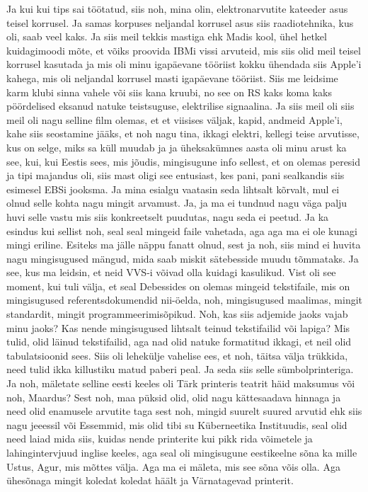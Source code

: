 Ja kui kui tips sai töötatud, siis noh, mina olin, elektronarvutite kateeder asus teisel korrusel. Ja samas korpuses neljandal korrusel asus siis raadiotehnika, kus oli, saab veel kaks. Ja siis meil tekkis mastiga ehk Madis kool, ühel hetkel kuidagimoodi mõte, et võiks proovida IBMi vissi arvuteid, mis siis olid meil teisel korrusel kasutada ja mis oli minu igapäevane tööriist kokku ühendada siis Apple'i kahega, mis oli neljandal korrusel masti igapäevane tööriist. Siis me leidsime karm klubi sinna vahele või siis kana kruubi, no see on RS kaks koma kaks pöördelised eksanud natuke teistsuguse, elektrilise signaalina. Ja siis meil oli siis meil oli nagu selline film olemas, et et viisises väljak, kapid, andmeid Apple'i, kahe siis seostamine jääks, et noh nagu tina, ikkagi elektri, kellegi teise arvutisse, kus on selge, miks sa küll muudab ja ja üheksakümnes aasta oli minu arust ka see, kui, kui Eestis sees, mis jõudis, mingisugune info sellest, et on olemas peresid ja tipi majandus oli, siis mast oligi see entusiast, kes pani, pani sealkandis siis esimesel EBSi jooksma. Ja mina esialgu vaatasin seda lihtsalt kõrvalt, mul ei olnud selle kohta nagu mingit arvamust. Ja, ja ma ei tundnud nagu väga palju huvi selle vastu mis siis konkreetselt puudutas, nagu seda ei peetud. Ja ka esindus kui sellist noh, seal seal mingeid faile vahetada, aga aga ma ei ole kunagi mingi eriline. Esiteks ma jälle näppu fanatt olnud, sest ja noh, siis mind ei huvita nagu mingisugused mängud, mida saab miskit sätebesside muudu tõmmataks. Ja see, kus ma leidsin, et neid VVS-i võivad olla kuidagi kasulikud. Vist oli see moment, kui tuli välja, et seal Debessides on olemas mingeid tekstifaile, mis on mingisugused referentsdokumendid nii-öelda, noh, mingisugused maalimas, mingit standardit, mingit programmeerimisõpikud. Noh, kas siis adjemide jaoks vajab minu jaoks?
Kas nende mingisugused lihtsalt teinud tekstifailid või lapiga?
Mis tulid, olid läinud tekstifailid, aga nad olid natuke formatitud ikkagi, et neil olid tabulatsioonid sees. Siis oli lehekülje vahelise ees, et noh, täitsa välja trükkida, need tulid ikka killustiku matud paberi peal.
Ja seda siis selle sümbolprinteriga.
Ja noh, mäletate selline eesti keeles oli Tärk printeris teatrit häid maksumus või noh, Maardus?
Sest noh, maa püksid olid, olid nagu kättesaadava hinnaga ja need olid enamusele arvutite taga sest noh, mingid suurelt suured arvutid ehk siis nagu jeeessil või Essemmid, mis olid tibi su Küberneetika Instituudis, seal olid need laiad mida siis, kuidas nende printerite kui pikk rida võimetele ja lahingintervjuud inglise keeles, aga seal oli mingisugune eestikeelne sõna ka mille Ustus, Agur, mis mõttes välja. Aga ma ei mäleta, mis see sõna võis olla. Aga ühesõnaga mingit koledat koledat häält ja Värnatagevad printerit.
